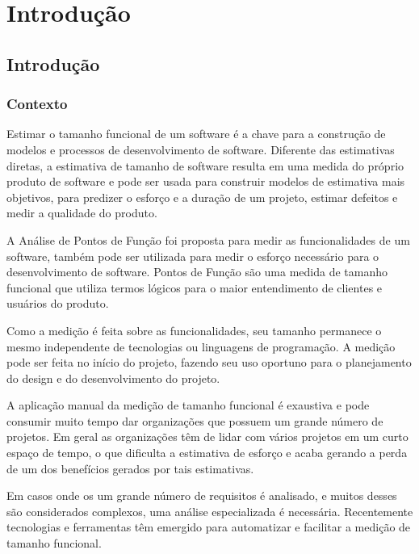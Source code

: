 \part{Introdução}

\chapter[Introdução]{Introdução}

\section{Contexto}

Estimar o tamanho funcional de um software é a chave para a construção de modelos e processos de desenvolvimento de software. Diferente das estimativas diretas, a estimativa de tamanho de software resulta em uma medida do próprio produto de software e pode ser usada para construir modelos de estimativa mais objetivos, para predizer o esforço e a duração de um projeto, estimar defeitos e medir a qualidade do produto. \cite{Ebert:2014}

A Análise de Pontos de Função foi proposta para medir as funcionalidades de um software, também pode ser utilizada para medir o esforço necessário para o desenvolvimento de software. Pontos de Função são uma medida de tamanho funcional que utiliza termos lógicos para o maior entendimento de clientes e usuários do produto. \cite{Albrecht:1994}

Como a medição é feita sobre as funcionalidades, seu tamanho permanece o mesmo independente de tecnologias ou linguagens de programação. A medição pode ser feita no início do projeto, fazendo seu uso oportuno para o planejamento do design e do desenvolvimento do projeto. \cite{Kusumoto:2002}

A aplicação manual da medição de tamanho funcional é exaustiva e pode consumir muito tempo dar organizações que possuem um grande número de projetos. Em geral as organizações têm de lidar com vários projetos em um curto espaço de tempo, o que dificulta a estimativa de esforço e acaba gerando a perda de um dos benefícios gerados por tais estimativas. \cite{Ebert:2014}


Em casos onde os um grande número de requisitos é analisado, e muitos desses são considerados complexos, uma análise especializada é necessária. Recentemente tecnologias e ferramentas têm emergido para automatizar e facilitar a medição de tamanho funcional. \cite{Ebert:2014}



